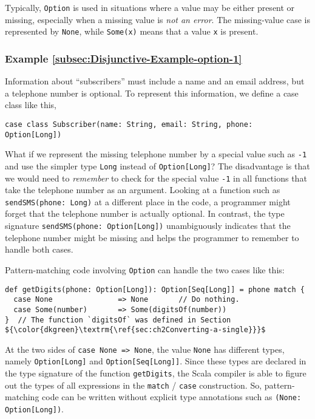 Typically, \lstinline!Option! is used in situations where a value
may be either present or missing, especially when a missing value
is \emph{not an error}. The missing-value case is represented by \lstinline!None!,
while \lstinline!Some(x)! means that a value \lstinline!x! is present.

\subsubsection{Example \label{subsec:Disjunctive-Example-option-1}\ref{subsec:Disjunctive-Example-option-1}}

Information about ``subscribers'' must include a name and an email
address, but a telephone number is optional. To represent this information,
we define a case class like this,
\begin{lstlisting}
case class Subscriber(name: String, email: String, phone: Option[Long])
\end{lstlisting}
What if we represent the missing telephone number by a special value
such as \lstinline!-1! and use the simpler type \lstinline!Long!
instead of \lstinline!Option[Long]!? The disadvantage is that we
would need to \emph{remember} to check for the special value \lstinline!-1!
in all functions that take the telephone number as an argument. Looking
at a function such as \lstinline!sendSMS(phone: Long)! at a different
place in the code, a programmer might forget that the telephone number
is actually optional. In contrast, the type signature \lstinline!sendSMS(phone: Option[Long])!
unambiguously indicates that the telephone number might be missing
and helps the programmer to remember to handle both cases.

Pattern-matching code involving \lstinline!Option! can handle the
two cases like this:
\begin{lstlisting}[mathescape=true]
def getDigits(phone: Option[Long]): Option[Seq[Long]] = phone match {
  case None               => None       // Do nothing.
  case Some(number)       => Some(digitsOf(number))
}  // The function `digitsOf` was defined in Section ${\color{dkgreen}\textrm{\ref{sec:ch2Converting-a-single}}}$
\end{lstlisting}

At the two sides of \lstinline!case None => None!, the value \lstinline!None!
has different types, namely \lstinline!Option[Long]! and \lstinline!Option[Seq[Long]]!.
Since these types are declared in the type signature of the function
\lstinline!getDigits!, the Scala compiler is able to figure out the
types of all expressions in the \lstinline!match! / \lstinline!case!
construction. So, pattern-matching code can be written without explicit
type annotations such as \lstinline!(None: Option[Long])!.

